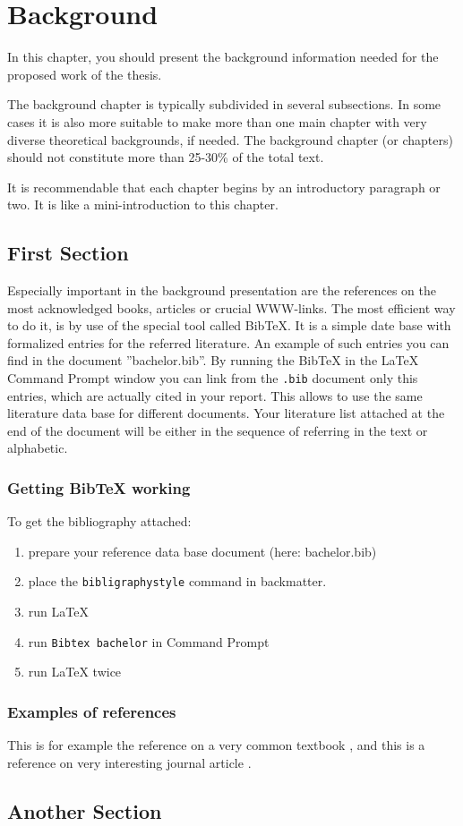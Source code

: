 \chapter{Background}\label{chap:background}
\beginchapter

In this chapter, you should present the background information needed for the
proposed work of the thesis. 


The background chapter is typically subdivided in several subsections.
In some cases it is also more suitable to make more than one main
chapter with very diverse theoretical backgrounds, if needed.
The background chapter (or chapters) should not constitute
more than 25-30\% of the total text.


It is recommendable that each chapter begins by an introductory 
paragraph or two. It is like a mini-introduction to this chapter. 


\section{First Section}

Especially important in the background  presentation are the references on
the most acknowledged books, articles or crucial WWW-links.  The most
efficient way to do it, is by use of the special tool called BibTeX.
It is a simple date base with formalized entries for the referred
literature.  An example of such entries you can find in the document
''bachelor.bib''.  By running the BibTeX in the LaTeX Command
Prompt window you can link from the \verb+.bib+ document only this entries,
which are actually cited in your report.  This allows to use the same
literature data base for different documents.  Your literature list
attached at the end of the document will be either in the sequence of
referring in the text or alphabetic.

\subsection{Getting BibTeX working}
\label{ss:bib-attach}

To get the bibliography attached:

\begin{enumerate}
    \item prepare your reference data base document (here: bachelor.bib)
    \item place the \verb"bibligraphystyle" command in backmatter.
    \item run LaTeX
    \item run \verb"Bibtex bachelor" in Command Prompt
    \item run LaTeX twice
\end{enumerate}

\subsection{Examples of references}
\label{ss:bib-ref-exe}


This is for example the reference on a very common textbook ,
and this is a reference on very interesting journal article .




\section{Another Section}
